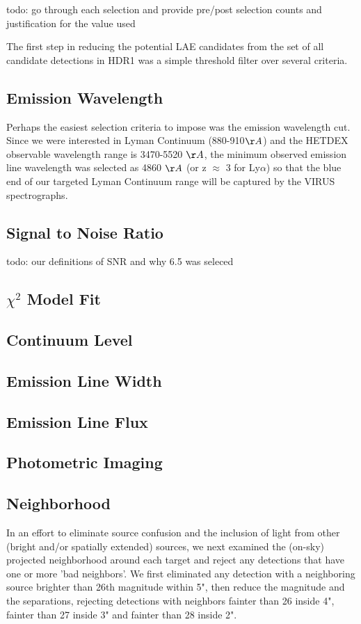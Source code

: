 \documentclass{aastex62}
\begin{document}
todo: go through each selection and provide pre/post selection counts and justification for the value used

The first step in reducing the potential LAE candidates from the set of all candidate detections in HDR1 was a simple threshold filter over several criteria. 

\subsection{Emission Wavelength}
Perhaps the easiest selection criteria to impose was the emission wavelength cut. Since we were interested in Lyman Continuum (880-910$\AA$) and the HETDEX observable wavelength range is 3470-5520 $\AA$, the minimum observed emission line wavelength was selected as 4860 $\AA$ (or z $\approx$ 3 for Ly$\alpha$) so that the blue end of our targeted Lyman Continuum range will be captured by the VIRUS spectrographs.

\subsection{Signal to Noise Ratio}
{ \color{red} todo: our definitions of SNR and why 6.5 was seleced }

\subsection{$\chi ^{2}$ Model Fit}

\subsection{Continuum Level}

\subsection{Emission Line Width}

\subsection{Emission Line Flux}

\subsection{Photometric Imaging}


\subsection{Neighborhood}
In an effort to eliminate source confusion and the inclusion of light from other (bright and/or spatially extended) sources, we next examined the (on-sky) projected neighborhood around each target and reject any detections that have one or more 'bad neighbors'. We first eliminated any detection with a neighboring source brighter than 26th magnitude within 5", then reduce the magnitude and the separations, rejecting detections with neighbors fainter than 26 inside 4", fainter than 27 inside 3" and fainter than 28 inside 2". 
\end{document}
